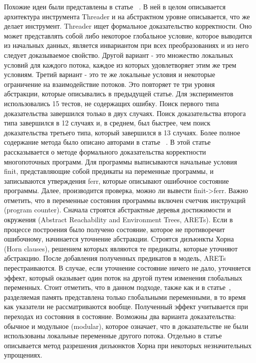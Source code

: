 Похожие идеи были представлены в статье ~\cite{Threader:2011}. В ней в целом описывается архитектура инструмента Threader и на абстрактном уровне описывается, что же делает инструмент.
Threader ищет формальное доказательство корректности. Оно может представлять собой либо некоторое глобальное условие, которое выводится из начальных данных, является инвариантом при всех преобразованиях и из него следует доказываемое свойство. Другой вариант - это множество локальных условий для каждого потока, каждое из которых удовлетворяет этим же трем условиям. Третий вариант - это те же локальные условия и некоторые ограничение на взаимодействие потоков. Это повторяет те три уровня абстракции, которые описывались в предыдущей статье.
Для экспериментов использовались 15 тестов, не содержащих ошибку. Поиск первого типа доказательства завершился только в двух случаях. Поиск доказательства второга типа завершился в 12 случаях и, в среднем, был быстрее, чем поиск доказательства третьего типа, который завершился в 13 случаях. 
Более полное содержание метода было описано авторами в статье ~\cite{Gupta:2011:POPL,Gupta:2011}.
В этой статье рассказывается о методе формального доказательства корректности многопоточных программ. Для программы выписываются начальные условия finit, представляющие собой предикаты на переменные программы, и записываются утверждения ferr, которые описывают ошибочное состояние программы. Далее, производится проверка, можно ли вывести finit->ferr. Важно отметить, что в переменные состояния программы включен счетчик инструкций (program counter).
Сначала строятся абстрактные деревья достижимости и окружения (Abstract Reachability and Environment Trees, ARETs). Если в процессе построения было получено состояние, которое не противоречит ошибочному, начинается уточнение абстракции. Строятся дизъюнкты Хорна (Horn clauses), решением которых являются те предикаты, которые уточняют абстракцию. После добавления полученных предикатов в модель, ARETs перестраиваются. В случае, если уточнение состояние ничего не дало, уточняется эффект, который оказывает один поток на другой путем изменения глобальных переменных. Стоит отметить, что в данном подходе, также как и в статье~\cite{Cordeiro:2011}, разделяемая память представлена только глобальными переменными, в то время как указатели не рассматриваются вообще. Полученный эффект учитывается при переходах из состояния в состояние. Возможны два варианта доказательства: обычное и модульное (modular), которое означает, что в доказательстве не были использованы локальные переменные другого потока. 
Отдельно в статье описывается метод разрешения дизъюнктов Хорна при некоторых незначительных упрощениях. 
